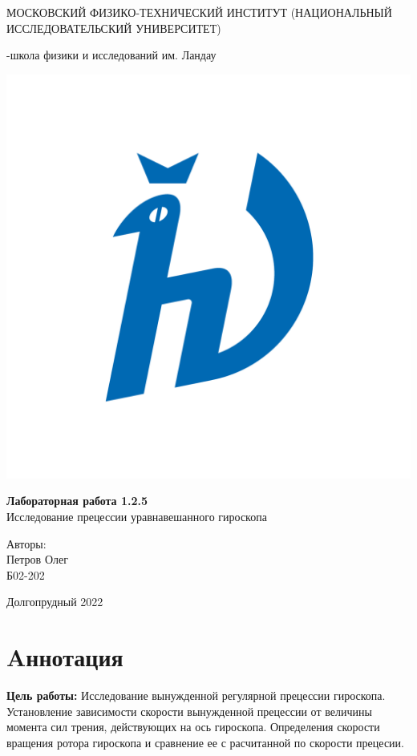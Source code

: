 \documentclass[a4paper,12pt]{article} %
\begin{document}
\begin{titlepage}
\begin{center}
    {\large МОСКОВСКИЙ ФИЗИКО-ТЕХНИЧЕСКИЙ ИНСТИТУТ (НАЦИОНАЛЬНЫЙ ИССЛЕДОВАТЕЛЬСКИЙ УНИВЕРСИТЕТ)}
\end{center}
\begin{center}
    {-школа физики и исследований им. Ландау}
\end{center}

\vspace{3.5cm}

\begin{center}
    \includegraphics[width=0.4\linewidth]{hv_full.png}
\end{center}
\vspace{0.1cm}
{\huge
\begin{center}
    {\bf Лабораторная работа 1.2.5}\\
    Исследование прецессии уравнавешанного гироскопа
\end{center}
}
\vspace{2cm}
\begin{flushright}
{\LARGE Авторы:\\ Петров Олег \\
\vspace{0.2cm}
Б02-202}
\end{flushright}
\vspace{3.5cm}
\begin{center}
    Долгопрудный 2022
\end{center}
\end{titlepage}

\section{Aннотация}
\textbf{Цель работы:} Исследование вынужденной регулярной прецессии гироскопа.
 Установление зависимости скорости вынужденной прецессии от величины момента сил трения, действующих на ось гироскопа.
 Определения скорости вращения ротора гироскопа и сравнение ее с расчитанной по скорости прецесии.\\
\end{document}

